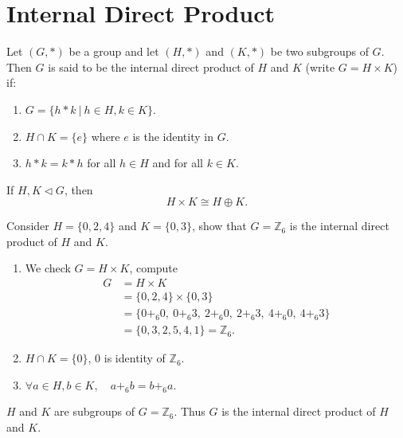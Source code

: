 \section{Internal Direct Product}

\begin{definition}
    Let $(G, *)$ be a group and let $(H, *)$ and $(K, *)$ be two subgroups of $G$. Then 
    $G$ is said to be the internal direct product of $H$ and $K$ (write $G = H \times K$) if:
    \begin{enumerate}
        \item $G = \{ h * k \> | \> h \in H, k \in K \}$.
        \item $H \cap K = \{e\}$ where $e$ is the identity in $G$.
        \item $h * k = k* h$ for all $h \in H$ and for all $k \in K$.
    \end{enumerate}
\end{definition}
\begin{remark}
    If $H, K \triangleleft G$, then 
    \[
        H \times K \cong H \oplus K.
    \]
\end{remark}

\begin{example}
    Consider $H = \{ 0, 2, 4 \}$ and $K = \{0, 3\}$, show that $G = \mathbb{Z}_6$ is the internal direct product of $H$ and $K$.
\end{example}
\begin{solution}
    \begin{enumerate}
        \item We check $G = H \times K$, compute 
        \begin{align*}
            G &= H \times K\\
            &= \{ 0, 2, 4 \} \times \{ 0, 3\}\\
            &= \{ 0 +_6 0,\> 0 +_6 3,\> 2 +_6 0,\> 2 +_6 3,\> 4 +_6 0,\> 4 +_6 3\}\\
            &= \{ 0, 3, 2, 5, 4, 1 \} = \mathbb{Z}_6.
        \end{align*}
        \item $H \cap K = \{ 0 \}$, $0$ is identity of $\mathbb{Z}_6$.
        \item $\forall a \in H, b \in K, \quad a +_6 b = b+_6 a$.
    \end{enumerate}
    $H$ and $K$ are subgroups of $G = \mathbb{Z}_6$. Thus $G$ is the internal direct product of $H$ and $K$.
\end{solution}


